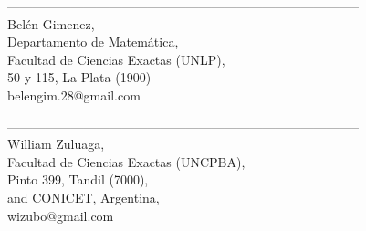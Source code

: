 \documentclass{article}
\begin{document}
-----------------------------------------------------------------------------------
\\
Belén Gimenez, \\
Departamento de Matem\'atica,\\
Facultad de Ciencias Exactas (UNLP),\\
50 y 115, La Plata (1900)\\
belengim.28@gmail.com


-----------------------------------------------------------------------------------
\\
William Zuluaga,\\
Facultad de Ciencias Exactas (UNCPBA),\\
Pinto 399, Tandil (7000),\\
and CONICET, Argentina,\\
wizubo@gmail.com
\end{document}

